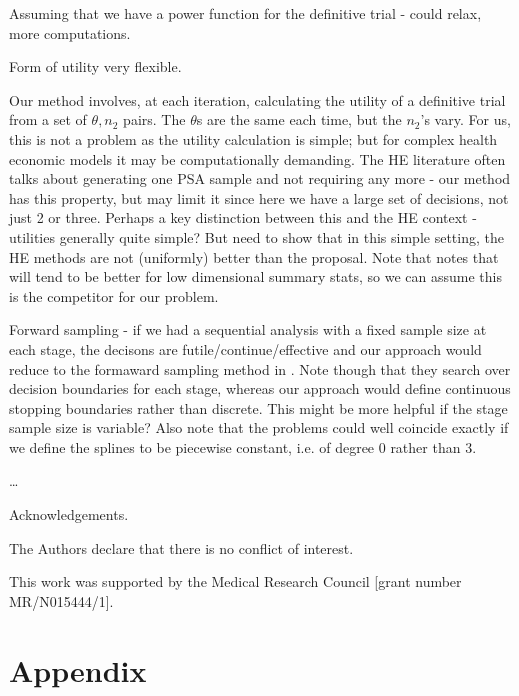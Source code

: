 \documentclass[sagev, Crown]{sagej} %
\begin{document}
Assuming that we have a power function for the definitive trial - could relax, more computations.

Form of utility very flexible.

Our method involves, at each iteration, calculating the utility of a definitive trial from a set of $\theta, n_2$ pairs. The $\theta$s are the same each time, but the $n_2$'s vary. For us, this is not a problem as the utility calculation is simple; but for complex health economic models it may be computationally demanding. The HE literature often talks about generating one PSA sample and not requiring any more - our method has this property, but may limit it since here we have a large set of decisions, not just 2 or three. Perhaps a key distinction between this and the HE context - utilities generally quite simple? But need to show that in this simple setting, the HE methods are not (uniformly) better than the proposal. Note that \cite{Heath2017} notes that \cite{Strong2015} will tend to be better for low dimensional summary stats, so we can assume this is the competitor for our problem.

Forward sampling - if we had a sequential analysis with a fixed sample size at each stage, the decisons are futile/continue/effective and our approach would reduce to the formaward sampling method in \cite{Carlin1998}. Note though that they search over decision boundaries for each stage, whereas our approach would define continuous stopping boundaries rather than discrete. This might be more helpful if the stage sample size is variable? Also note that the problems could well coincide exactly if we define the splines to be piecewise constant, i.e. of degree 0 rather than 3.


\ldots

\begin{acks}
Acknowledgements.
\end{acks}

\begin{dci}
The Authors declare that there is no conflict of interest.
\end{dci}

\begin{funding}
This work was supported by the Medical Research Council [grant number MR/N015444/1].
\end{funding}




\section*{Appendix}
\end{document}
